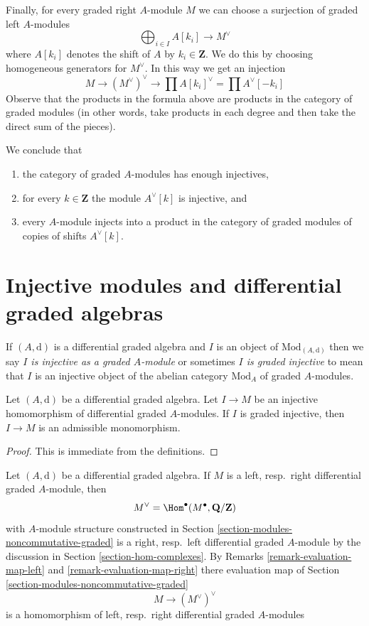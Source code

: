 \medskip\noindent
Finally, for every graded right $A$-module $M$ we can choose a surjection
of graded left $A$-modules
$$
\bigoplus\nolimits_{i \in I} A[k_i] \to M^\vee
$$
where $A[k_i]$ denotes the shift of $A$ by $k_i \in \mathbf{Z}$.
We do this by choosing homogeneous generators for $M^\vee$.
In this way we get an injection
$$
M \to (M^\vee)^\vee \to \prod A[k_i]^\vee = \prod A^\vee[-k_i]
$$
Observe that the products in the formula above are products in the
category of graded modules (in other words, take products in each degree
and then take the direct sum of the pieces).

\medskip\noindent
We conclude that
\begin{enumerate}
\item the category of graded $A$-modules has enough injectives,
\item for every $k \in \mathbf{Z}$ the module $A^\vee[k]$ is injective, and
\item every $A$-module injects into a product in the category of graded
modules of copies of shifts $A^\vee[k]$.
\end{enumerate}





\section{Injective modules and differential graded algebras}
\label{section-modules-noncommutative-differential-graded}

\noindent
If $(A, \text{d})$ is a differential graded algebra and $I$ is
an object of $\text{Mod}_{(A, \text{d})}$ then we say
{\it $I$ is injective as a graded $A$-module} or sometimes
{\it $I$ is graded injective} to mean
that $I$ is an injective object of the abelian category $\text{Mod}_A$
of graded $A$-modules.

\begin{lemma}
\label{lemma-source-graded-injective}
Let $(A, \text{d})$ be a differential graded algebra.
Let $I \to M$ be an injective homomorphism of differential graded
$A$-modules. If $I$ is graded injective, then
$I \to M$ is an admissible monomorphism.
\end{lemma}

\begin{proof}
This is immediate from the definitions.
\end{proof}

\noindent
Let $(A, \text{d})$ be a differential graded algebra. If $M$ is a
left, resp.\ right differential graded $A$-module, then
$$
M^\vee = \Hom^\bullet(M^\bullet, \mathbf{Q}/\mathbf{Z})
$$
with $A$-module structure constructed in
Section \ref{section-modules-noncommutative-graded} is a
right, resp.\ left differential graded $A$-module by the
discussion in Section \ref{section-hom-complexes}.
By Remarks
\ref{remark-evaluation-map-left} and \ref{remark-evaluation-map-right}
there evaluation map of Section \ref{section-modules-noncommutative-graded}
$$
M \longrightarrow (M^\vee)^\vee
$$
is a homomorphism of left, resp.\ right differential graded $A$-modules

